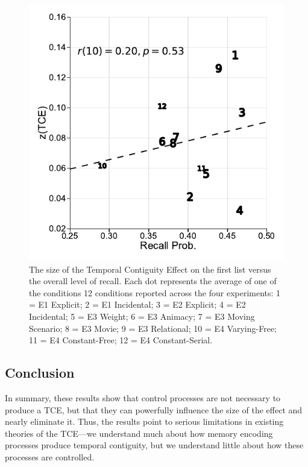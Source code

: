 \documentclass[man,natbib,floatsintext]{apa6} %
\begin{document}
\begin{figure}%
\includegraphics{figures/correlation.pdf}
\caption{The size of the Temporal Contiguity Effect on the first list versus the overall level of recall. Each dot represents the average of one of the conditions 12 conditions reported across the four experiments: 1 = E1 Explicit; 2 = E1 Incidental; 3 = E2 Explicit; 4 = E2 Incidental; 5 = E3 Weight; 6 = E3 Animacy; 7 = E3 Moving Scenario; 8 = E3 Movie; 9 = E3 Relational; 10 = E4 Varying-Free; 11 = E4 Constant-Free; 12 = E4 Constant-Serial.}
\label{corr}
\end{figure}

\color{black}


\subsection{Conclusion}
In summary, these results show that control processes are not necessary to produce a TCE, but that they can powerfully influence the size of the effect and nearly eliminate it. Thus, the results point to serious limitations in existing theories of the TCE---we understand much about how memory encoding processes produce temporal contiguity, but we understand little about how these processes are controlled.


\end{document}
